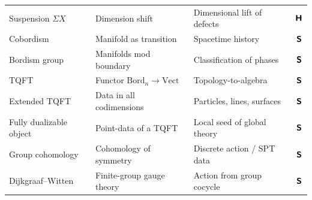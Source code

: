 \documentclass[12pt]{article}
\theoremstyle{definition}
\theoremstyle{remark}
\newcommand{\Bord}{\mathrm{Bord}}
\newcommand{\Vect}{\mathrm{Vect}}
\newcommand{\Sfont}{\textnormal{\sffamily\bfseries S}}
\newcommand{\Hfont}{\textnormal{\sffamily\bfseries H}}
\begin{document}
{\begin{longtable}{%
  >{\raggedright\arraybackslash}p{4.2cm}%
  >{\raggedright\arraybackslash}p{4.8cm}%
  >{\raggedright\arraybackslash}p{3.4cm}%
  c}
Suspension $\Sigma X$ & Dimension shift & Dimensional lift of defects & $\Hfont$\\
Cobordism & Manifold as transition & Spacetime history & $\Sfont$\\
Bordism group & Manifolds mod boundary & Classification of phases & $\Sfont$\\
TQFT & Functor $\Bord_n\to\Vect$ & Topology-to-algebra & $\Sfont$\\
Extended TQFT & Data in all codimensions & Particles, lines, surfaces & $\Sfont$\\
Fully dualizable object & Point-data of a TQFT & Local seed of global theory & $\Sfont$\\
Group cohomology & Cohomology of symmetry & Discrete action / SPT data & $\Sfont$\\
Dijkgraaf--Witten & Finite-group gauge theory & Action from group cocycle & $\Sfont$\\
\end{longtable}
}
\end{document}
